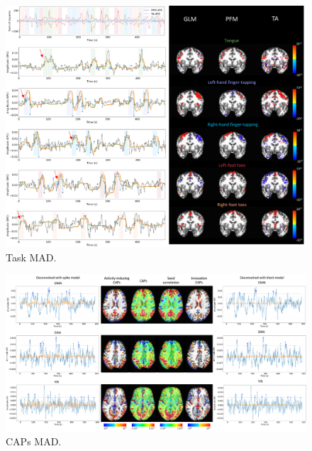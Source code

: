 \begin{figure}[h!]
    \begin{center}
        \includegraphics[width=\textwidth]{figures/supp_task_maps_mad.pdf}
    \end{center}
    \caption{Task MAD.}
\label{fig:task_mad}
\end{figure}

\begin{figure}[h!]
    \begin{center}
        \includegraphics[width=\textwidth]{figures/supp_caps_mad.pdf}
    \end{center}
    \caption{CAPs MAD.}
\label{fig:caps_mad}
\end{figure}